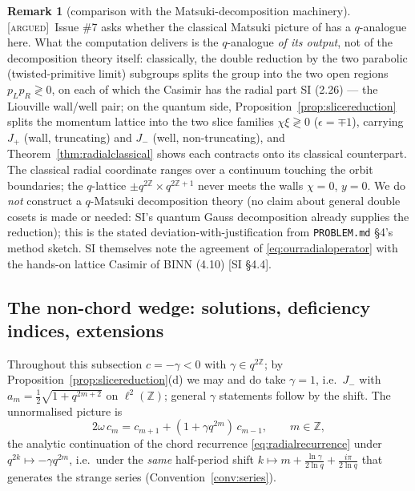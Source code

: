 \documentclass[11pt,a4paper]{article}
\newcommand{\ARGUED}{{\color{orange}\textsc{[argued]}}}
\theoremstyle{definition}
\newtheorem{remark}[definition]{Remark}
\theoremstyle{plain}
\newcommand{\Z}{\mathbb{Z}}
\begin{document}
\begin{remark}[comparison with the Matsuki-decomposition machinery]\label{rem:matsuki}
\ARGUED\ Issue \#7 asks whether the classical Matsuki picture of
\cite{Schlosser:2024matsuki} has a $q$-analogue here. What the computation delivers is the
$q$-analogue \emph{of its output}, not of the decomposition theory itself: classically, the
double reduction by the two parabolic (twisted-primitive limit) subgroups splits the group
into the two open regions $p_{L}p_{R}\gtrless0$, on each of which the Casimir has the radial
part SI (2.26) --- the Liouville wall/well pair; on the quantum side,
Proposition~\ref{prop:slicereduction} splits the momentum lattice into the two slice families
$\chi\xi\gtrless0$ ($\epsilon=\mp1$), carrying $J_{+}$ (wall, truncating) and $J_{-}$ (well,
non-truncating), and Theorem~\ref{thm:radialclassical} shows each contracts onto its
classical counterpart. The classical radial coordinate ranges over a continuum touching the
orbit boundaries; the $q$-lattice $\pm q^{2\Z}\times q^{2\Z+1}$ never meets the walls
$\chi=0$, $y=0$. We do \emph{not} construct a $q$-Matsuki decomposition theory (no claim
about general double cosets is made or needed: SI's quantum Gauss decomposition already
supplies the reduction); this is the stated deviation-with-justification from
\texttt{PROBLEM.md} \S4's method sketch. SI themselves note the agreement of
\eqref{eq:ourradialoperator} with the hands-on lattice Casimir of BINN
\cite{Berkooz:2022qgroup} (4.10) [SI \S4.4].
\end{remark}

\subsection{The non-chord wedge: solutions, deficiency indices, extensions}
\label{sec:wedge}

Throughout this subsection $c=-\gamma<0$ with $\gamma\in q^{2\Z}$; by
Proposition~\ref{prop:slicereduction}(d) we may and do take $\gamma=1$, i.e.\
$J_{-}$ with $a_{m}=\tfrac12\sqrt{1+q^{2m+2}}$ on $\ell^{2}(\Z)$; general $\gamma$ statements
follow by the shift. The unnormalised picture is
\begin{equation}\label{eq:wedgerecurrence}
  2\omega\,c_{m}=c_{m+1}+(1+\gamma q^{2m})\,c_{m-1},\qquad m\in\Z,
  \tag{R$'$}
\end{equation}
the analytic continuation of the chord recurrence \eqref{eq:radialrecurrence} under
$q^{2k}\mapsto-\gamma q^{2m}$, i.e.\ under the \emph{same} half-period shift
$k\mapsto m+\tfrac{\ln\gamma}{2\ln q}+\tfrac{i\pi}{2\ln q}$ that generates the strange series
(Convention~\ref{conv:series}).
\end{document}
